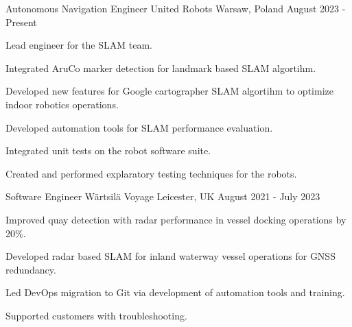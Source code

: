 

\begin{cventries}

  \cventry
    {Autonomous Navigation Engineer} %
    {United Robots} %
    {Warsaw, Poland} %
    {August 2023 - Present} %
    {
      \begin{cvitems} %
        \item {Lead engineer for the SLAM team.}
        \item {Integrated AruCo marker detection for landmark based SLAM algortihm.}
        \item {Developed new features for Google cartographer SLAM algortihm to optimize indoor robotics operations.}
        \item {Developed automation tools for SLAM performance evaluation.}
        \item {Integrated unit tests on the robot software suite.}
        \item {Created and performed explaratory testing techniques for the robots.}
      \end{cvitems}
    }
  \cventry
    {Software Engineer} %
    {Wärtsilä Voyage} %
    {Leicester, UK} %
    {August 2021 - July 2023} %
    {
      \begin{cvitems} %
        \item {Improved quay detection with radar performance in vessel docking operations by 20\%.}
        \item {Developed radar based SLAM for inland waterway vessel operations for GNSS redundancy.}
        \item {Led DevOps migration to Git via development of automation tools and training.}
        \item {Supported customers with troubleshooting.}
      \end{cvitems}
    }

\end{cventries}
